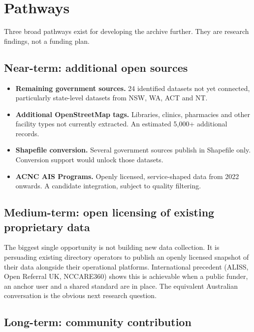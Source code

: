 \documentclass[11pt,a4paper]{article}
\begin{document}

\section{Pathways}

Three broad pathways exist for developing the archive further. They are research findings, not a funding plan.

\subsection{Near-term: additional open sources}

\begin{itemize}[nosep]
    \item \textbf{Remaining government sources.} 24 identified datasets not yet connected, particularly state-level datasets from NSW, WA, ACT and NT.
    \item \textbf{Additional OpenStreetMap tags.} Libraries, clinics, pharmacies and other facility types not currently extracted. An estimated 5{,}000+ additional records.
    \item \textbf{Shapefile conversion.} Several government sources publish in Shapefile only. Conversion support would unlock those datasets.
    \item \textbf{ACNC AIS Programs.} Openly licensed, service-shaped data from 2022 onwards. A candidate integration, subject to quality filtering.
\end{itemize}

\subsection{Medium-term: open licensing of existing proprietary data}

The biggest single opportunity is not building new data collection. It is persuading existing directory operators to publish an openly licensed snapshot of their data alongside their operational platforms. International precedent (ALISS, Open Referral UK, NCCARE360) shows this is achievable when a public funder, an anchor user and a shared standard are in place. The equivalent Australian conversation is the obvious next research question.

\subsection{Long-term: community contribution}
\end{document}

